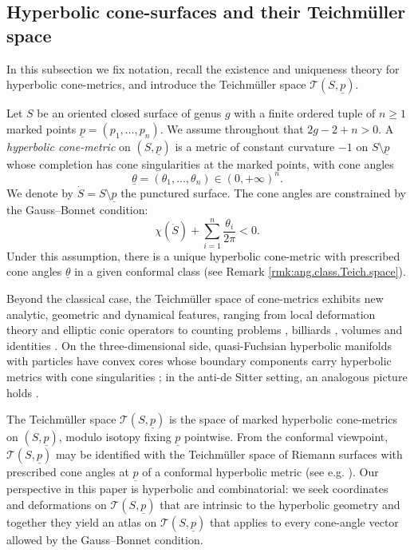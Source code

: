 \documentclass[11pt, letterpaper]{amsart}
\theoremstyle{definition}
\theoremstyle{remark}
\newcommand{\up}{\underline{p}}
\newcommand{\cTp}{\mathcal{T} (S,\up)}
\numberwithin{equation}{section}
\begin{document}
    
\subsection{Hyperbolic cone-surfaces and their Teichm\"uller space}
\label{subsec:Teich}

In this subsection we fix notation, recall the existence and uniqueness theory for hyperbolic cone-metrics, and introduce the Teichm\"uller space \(\cTp\).

Let \(S\) be an oriented closed surface of genus \(g\) with a finite ordered tuple of $n\geq 1$ marked points \(\underline{p} = (p_1,\dots,p_n)\).
We assume throughout that \(2g-2+n > 0\).
A \emph{hyperbolic cone-metric} on \((S,\underline{p})\) is a metric of constant curvature \(-1\) on \(S \setminus \underline{p}\) whose completion has cone singularities at the marked points, with cone angles
\[
  \underline{\theta} = (\theta_1,\dots,\theta_n) \in (0,+\infty)^n.
\]
We denote by \(\dot{S} = S \setminus \underline{p}\) the punctured surface.
The cone angles are constrained by the Gauss--Bonnet condition:
\begin{equation}\label{eq:Gauss-Bonnet condition}
  \chi(\dot{S}) + \sum_{i=1}^n \frac{\theta_i}{2\pi} < 0.
\end{equation}
Under this assumption, there is a unique hyperbolic cone-metric with prescribed cone angles $\underline{\theta}$ in a given conformal class \cite{Hei62, McO88, Tro91, FX25} (see Remark \ref{rmk:ang.class.Teich.space}). 

Beyond the classical case, the Teichm\"uller space of cone-metrics exhibits new analytic, geometric and dynamical features, ranging from local deformation theory and elliptic conic operators \cite{MW17} to counting problems \cite{ES22}, billiards \cite{ELS22}, volumes \cite{DN09, AN22} and identities \cite{TWZ06, BPT25}.
On the three-dimensional side, quasi-Fuchsian hyperbolic manifolds with particles have convex cores whose boundary components carry hyperbolic metrics with cone singularities \cite{KS07, MS09, LS14}; in the anti-de Sitter setting, an analogous picture holds \cite{KS07, BS09, CS20}.

The Teichm\"uller space \(\cTp\) is the space of marked hyperbolic cone-metrics on \((S,\underline{p})\), modulo isotopy fixing \(\underline{p}\) pointwise.
From the conformal viewpoint, \(\cTp\) may be identified with the Teichm\"uller space of Riemann surfaces with prescribed cone angles at $\up$ of a conformal hyperbolic metric (see e.g. \cite{McO88, Tro91, ST05, Mon10, MW17}). 
Our perspective in this paper is hyperbolic and combinatorial: we seek coordinates and deformations on \(\cTp\) that are intrinsic to the hyperbolic geometry and together they yield an atlas on $\cTp$ that applies to every cone-angle vector allowed by the Gauss–Bonnet condition.
 
\end{document}

